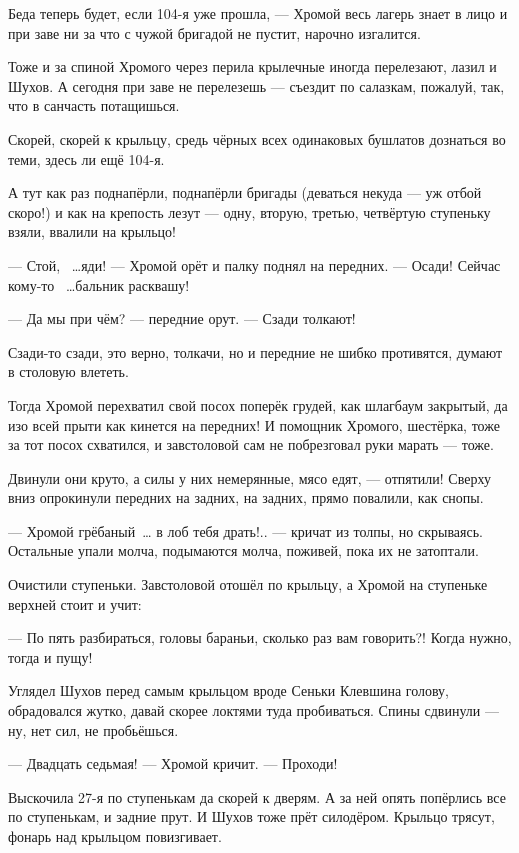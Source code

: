 Беда теперь будет, если 104-я уже прошла, --- Хромой весь лагерь знает в лицо и при заве ни за что 
с чужой бригадой не пустит, нарочно изгалится.

Тоже и за спиной Хромого через перила крылечные иногда перелезают, лазил и Шухов. А сегодня 
при заве не перелезешь --- съездит по салазкам, пожалуй, так, что в санчасть потащишься.

Скорей, скорей к крыльцу, средь чёрных всех одинаковых бушлатов дознаться во теми, здесь ли 
ещё 104-я.

А тут как раз поднапёрли, поднапёрли бригады (деваться некуда --- уж отбой скоро!) и как на 
крепость лезут --- одну, вторую, третью, четвёртую ступеньку взяли, ввалили на крыльцо!

--- Стой, ~\dots{}яди! --- Хромой орёт и палку поднял на передних. --- Осади! Сейчас кому-то 
~\dots{}бальник расквашу!

--- Да мы при чём? --- передние орут. --- Сзади толкают!

Сзади-то сзади, это верно, толкачи, но и передние не шибко противятся, думают в столовую 
влететь.

Тогда Хромой перехватил свой посох поперёк грудей, как шлагбаум закрытый, да изо всей прыти 
как кинется на передних! И помощник Хромого, шестёрка, тоже за тот посох схватился, и 
завстоловой сам не побрезговал руки марать --- тоже.

Двинули они круто, а силы у них немерянные, мясо едят, --- отпятили! Сверху вниз опрокинули 
передних на задних, на задних, прямо повалили, как снопы.

--- Хромой грёбаный~\dots{} в лоб тебя драть!.. --- кричат из толпы, но скрываясь. Остальные упали 
молча, подымаются молча, поживей, пока их не затоптали.

Очистили ступеньки. Завстоловой отошёл по крыльцу, а Хромой на ступеньке верхней стоит и 
учит:

--- По пять разбираться, головы бараньи, сколько раз вам говорить?! Когда нужно, тогда и пущу!

Углядел Шухов перед самым крыльцом вроде Сеньки Клевшина голову, обрадовался жутко, давай 
скорее локтями туда пробиваться. Спины сдвинули --- ну, нет сил, не пробьёшься.

--- Двадцать седьмая! --- Хромой кричит. --- Проходи!

Выскочила 27-я по ступенькам да скорей к дверям. А за ней опять попёрлись все по ступенькам, и 
задние прут. И Шухов тоже прёт силодёром. Крыльцо трясут, фонарь над крыльцом повизгивает.

